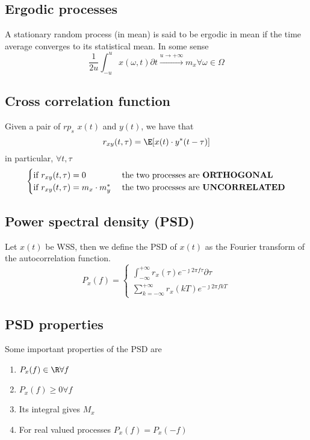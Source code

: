 \subsection{Ergodic processes}
A stationary random process (in mean) is said to be ergodic in mean if the time average converges to its statistical mean. In some sense
\begin{equation}
  \frac{1}{2 u} \int_{-u}^u x(\omega,t) \partial t \stackrel{u \to +\infty}{\rightarrow} m_x \forall \omega \in \Omega
\end{equation}

\subsection{Cross correlation function}
Given a pair of $rp_s$ $x(t)$ and $y(t)$, we have that
\begin{equation}
  r_{xy}(t,\tau) = \E[x(t) \cdot y^*(t-\tau)]
\end{equation}
in particular, $\forall t,\tau$
\begin{equation}
  \begin{cases}
    \text{if } r_{xy}(t,\tau)=0 & \text{ the two processes are \textbf{ORTHOGONAL}}\\
    \text{if } r_{xy}(t,\tau)=m_x \cdot m_y^* & \text{ the two processes are \textbf{UNCORRELATED}}\\
  \end{cases}
\end{equation}

\subsection{Power spectral density (PSD)}
Let $x(t)$ be WSS, then we define the PSD of $x(t)$ as the Fourier transform of the autocorrelation function.
\begin{equation}P_x(f)=
  \begin{cases}
    \int_{-\infty}^{+\infty} r_x(\tau)e^{-\jmath 2\pi f \tau} \partial \tau \\
    \sum\limits_{k=-\infty}^{+\infty} r_x(k T)e^{-\jmath 2\pi f k T}
  \end{cases}
\end{equation}
\subsection{PSD properties}
Some important properties of the PSD are
\begin{enumerate}
  \item $P_x(f)\in \R \forall f$
  \item $P_x(f)\ge 0 \forall f$
  \item Its integral gives $M_x$
  \item For real valued processes $P_x(f)=P_x(-f)$
\end{enumerate}


